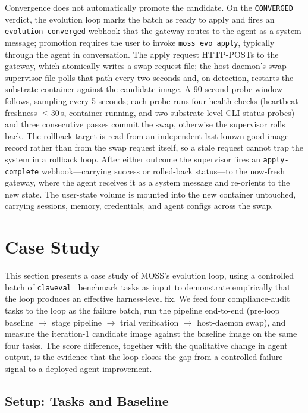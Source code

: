 \documentclass{article}
\begin{document}
Convergence does not automatically promote the candidate. On the \texttt{CONVERGED} verdict, the evolution loop marks the batch as ready to apply and fires an \texttt{evolution-converged} webhook that the gateway routes to the agent as a system message; promotion requires the user to invoke \texttt{moss evo apply}, typically through the agent in conversation. The apply request HTTP-POSTs to the gateway, which atomically writes a swap-request file; the host-daemon's swap-supervisor file-polls that path every two seconds and, on detection, restarts the substrate container against the candidate image. A 90-second probe window follows, sampling every 5 seconds; each probe runs four health checks (heartbeat freshness $\leq 30$\,s, container running, and two substrate-level CLI status probes) and three consecutive passes commit the swap, otherwise the supervisor rolls back. The rollback target is read from an independent last-known-good image record rather than from the swap request itself, so a stale request cannot trap the system in a rollback loop. After either outcome the supervisor fires an \texttt{apply-complete} webhook---carrying success or rolled-back status---to the now-fresh gateway, where the agent receives it as a system message and re-orients to the new state. The user-state volume is mounted into the new container untouched, carrying sessions, memory, credentials, and agent configs across the swap.



\section{Case Study}
\label{sec:case-study}

This section presents a case study of MOSS's evolution loop, using a controlled batch of \texttt{claweval}~\citep{ye2026claw} benchmark tasks as input to demonstrate empirically that the loop produces an effective harness-level fix. We feed four compliance-audit tasks to the loop as the failure batch, run the pipeline end-to-end (pre-loop baseline $\rightarrow$ stage pipeline $\rightarrow$ trial verification $\rightarrow$ host-daemon swap), and measure the iteration-1 candidate image against the baseline image on the same four tasks. The score difference, together with the qualitative change in agent output, is the evidence that the loop closes the gap from a controlled failure signal to a deployed agent improvement.

\subsection{Setup: Tasks and Baseline}
\label{subsec:case-setup}
\end{document}
